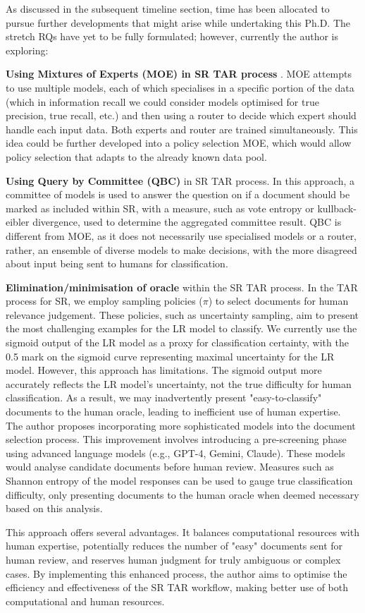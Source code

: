 \documentclass[../main.tex]{subfiles}
\begin{document}
As discussed in the subsequent timeline section, time has been allocated to pursue further developments that might arise while undertaking this Ph.D. The stretch RQs have yet to be fully formulated; however, currently the author is exploring:

\textbf{Using Mixtures of Experts (MOE) in SR TAR process} \cite{cai_came_2023}. MOE attempts to use multiple models, each of which specialises in a specific portion of the data (which in information recall we could consider models optimised for true precision, true recall, etc.) and then using a router to decide which expert should handle each input data. Both experts and router are trained simultaneously. This idea could be further developed into a policy selection MOE, which would allow policy selection that adapts to the already known data pool.

\textbf{Using Query by Committee (QBC)} in SR TAR process\cite{hino_active_2022}. In this approach, a committee of models is used to answer the question on if a document should be marked as included within SR, with a measure, such as vote entropy or kullback-eibler divergence, used to determine the aggregated committee result. QBC is different from MOE, as it does not necessarily use specialised models or a router, rather, an ensemble of diverse models to make decisions, with the more disagreed about input being sent to humans for classification.

\textbf{Elimination/minimisation of oracle} within the SR TAR process. In the TAR  process for SR, we employ sampling policies (\(\pi\)) to select documents for human relevance judgement. These policies, such as uncertainty sampling, aim to present the most challenging examples for the LR model to classify. We currently use the sigmoid output of the LR model as a proxy for classification certainty, with the 0.5 mark on the sigmoid curve representing maximal uncertainty for the LR model. However, this approach has limitations. The sigmoid output more accurately reflects the LR model's uncertainty, not the true difficulty for human classification. As a result, we may inadvertently present "easy-to-classify" documents to the human oracle, leading to inefficient use of human expertise. The author proposes incorporating more sophisticated models into the document selection process. This improvement involves introducing a pre-screening phase using advanced language models (e.g., GPT-4, Gemini, Claude). These models would analyse candidate documents before human review. Measures such as Shannon entropy of the model responses can be used to gauge true classification difficulty, only presenting documents to the human oracle when deemed necessary based on this analysis.

This approach offers several advantages. It balances computational resources with human expertise, potentially reduces the number of "easy" documents sent for human review, and reserves human judgment for truly ambiguous or complex cases. By implementing this enhanced process, the author aims to optimise the efficiency and effectiveness of the SR TAR workflow, making better use of both computational and human resources.
\end{document}
